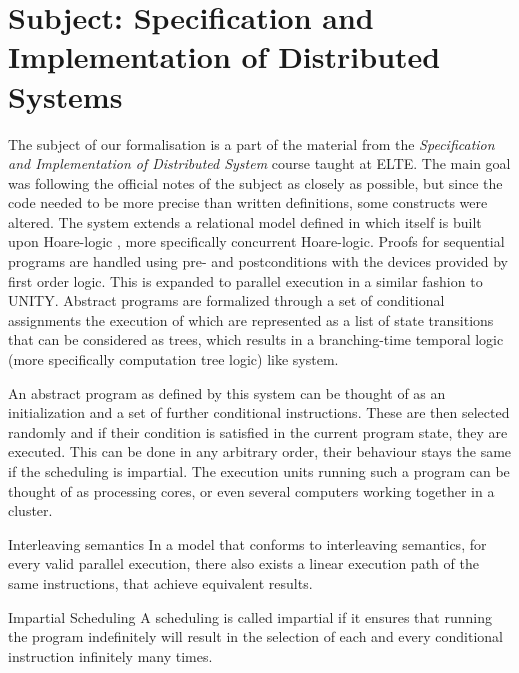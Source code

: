 \section{Subject: Specification and Implementation of Distributed Systems}
\label{sec:subject}

The subject of our formalisation is a part of the material from the \textit{Specification and Implementation of Distributed System} course taught at ELTE. The main goal was following the official notes of the subject\cite{hz-orsi} as closely as possible, but since the code needed to be more precise than written definitions, some constructs were altered. The system extends a relational model defined in \cite{fothi-prog} which itself is built upon Hoare-logic \cite{hoare1978proof}\cite{hoare-logic}, more specifically concurrent Hoare-logic\cite{Lamport1980}. Proofs for sequential programs are handled using pre- and postconditions with the devices provided by first order logic. This is expanded to parallel execution in a similar fashion to UNITY. Abstract programs are formalized through a set of conditional assignments the execution of which are represented as a list of state transitions that can be considered as trees, which results in a branching-time temporal logic \cite{emerson1988branching} (more specifically computation tree logic) like system.

An abstract program as defined by this system can be thought of as an initialization and a set of further conditional instructions. These are then selected randomly and if their condition is satisfied in the current program state, they are executed. This can be done in any arbitrary order, their behaviour stays the same if the scheduling is impartial. The execution units running such a program can be thought of as processing cores, or even several computers working together in a cluster.

\begin{definition}{Interleaving semantics}
\label{def:interleaving-semantics}
In a model that conforms to interleaving semantics, for every valid parallel execution, there also exists a linear execution path of the same instructions, that achieve equivalent results.
\end{definition}

\begin{definition}{Impartial Scheduling}
\label{def:impartial-scheduling}
A scheduling is called impartial if it ensures that running the program indefinitely will result in the selection of each and every conditional instruction infinitely many times.
\end{definition}

